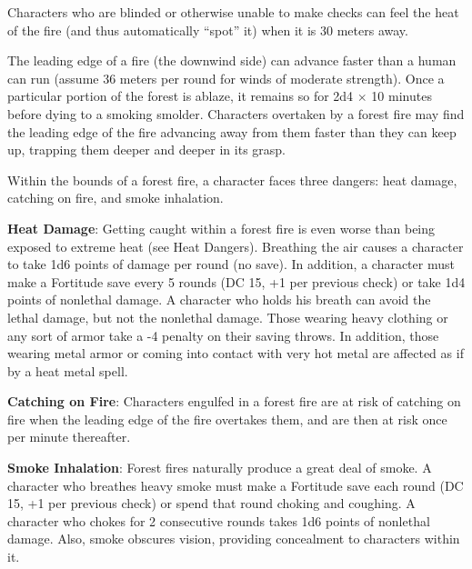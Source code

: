 Characters who are blinded or otherwise unable to make  checks can feel the heat of the fire (and thus automatically ``spot'' it) when it is 30 meters away.

The leading edge of a fire (the downwind side) can advance faster than a human can run (assume 36 meters per round for winds of moderate strength). Once a particular portion of the forest is ablaze, it remains so for 2d4 $\times$ 10 minutes before dying to a smoking smolder. Characters overtaken by a forest fire may find the leading edge of the fire advancing away from them faster than they can keep up, trapping them deeper and deeper in its grasp.

Within the bounds of a forest fire, a character faces three dangers: heat damage, catching on fire, and smoke inhalation.

\textbf{Heat Damage}: Getting caught within a forest fire is even worse than being exposed to extreme heat (see Heat Dangers). Breathing the air causes a character to take 1d6 points of damage per round (no save). In addition, a character must make a Fortitude save every 5 rounds (DC 15, +1 per previous check) or take 1d4 points of nonlethal damage. A character who holds his breath can avoid the lethal damage, but not the nonlethal damage. Those wearing heavy clothing or any sort of armor take a -4 penalty on their saving throws. In addition, those wearing metal armor or coming into contact with very hot metal are affected as if by a heat metal spell.

\textbf{Catching on Fire}: Characters engulfed in a forest fire are at risk of catching on fire when the leading edge of the fire overtakes them, and are then at risk once per minute thereafter.

\textbf{Smoke Inhalation}: Forest fires naturally produce a great deal of smoke. A character who breathes heavy smoke must make a Fortitude save each round (DC 15, +1 per previous check) or spend that round choking and coughing. A character who chokes for 2 consecutive rounds takes 1d6 points of nonlethal damage. Also, smoke obscures vision, providing concealment to characters within it.